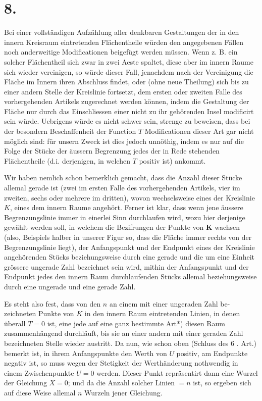 \documentclass[twoside,12pt, showframe]{memoir}
\begin{document}
\section*{8.}
Bei einer vollständigen Aufzählung aller denkbaren Gestaltungen der in den innern Kreisraum eintretenden Flächentheile würden den angegebenen Fällen noch anderweitige Modificationen beigefügt werden müssen. Wenn z. B. ein solcher Flächentheil sich zwar in zwei Aeste spaltet, diese aber im innern Raume sich wieder vereinigen, so würde dieser Fall, jenachdem nach der Vereinigung die Fläche im Innern ihren Abschluss findet, oder (ohne neue Theilung) sich bis zu einer andern Stelle der Kreislinie fortsetzt, dem ersten oder zweiten Falle des vorhergehenden Artikels zugerechnet werden können, indem die Gestaltung der Fläche nur durch das Einschliessen einer nicht zu ihr gehörenden Insel modificirt sein würde. Uebrigens würde es nicht schwer sein, strenge zu beweisen, dass bei der besondern Beschaffenheit der Function \(T\) Modificationen dieser Art gar nicht möglich sind: für unsern Zweck ist dies jedoch unnöthig, indem es nur auf die Folge der Stücke der äussern Begrenzung jedes der in Rede stehenden Flächentheile (d.i. derjenigen, in welchen \(T\) positiv ist) ankommt.

Wir haben nemlich schon bemerklich gemacht, dass die Anzahl dieser Stücke allemal gerade ist (zwei im ersten Falle des vorhergehenden Artikels, vier im zweiten, sechs oder mehrere im dritten), wovon wechselsweise eines der Kreislinie \(K\), eines dem innern Raume angehört. Ferner ist klar, dass wenn jene äussere Begrenzungslinie immer in einerlei Sinn durchlaufen wird, wozu hier derjenige gewählt werden soll, in welchem die Bezifrungen der Punkte von \(\boldsymbol{K}\) wachsen (also, Beispiels halber in unserer Figur so, dass die Fläche immer rechts von der Begrenzungslinie liegt), der Anfangspunkt und der Endpunkt eines der Kreislinie angehörenden Stücks beziehungsweise durch eine gerade und die um eine Einheit grössere ungerade Zahl bezeichnet sein wird, mithin der Anfangspunkt und der Endpunkt jedes den innern Raum durchlaufenden Stücks allemal beziehungsweise durch eine ungerade und eine gerade Zahl.

Es steht also fest, dass von den \(n\) an einem mit einer ungeraden Zahl be-
zeichneten Punkte von \(K\) in den innern Raum eintretenden Linien, in denen überall \(T=0\) ist, eine jede auf eine ganz bestimmte Art*) diesen Raum zusammenhängend durchläuft, bis sie an einer andern mit einer geraden Zahl bezeichneten Stelle wieder austritt. Da nun, wie schon oben (Schluss des 6 . Art.) bemerkt ist, in ihrem Anfangspunkte den Werth von \(U\) positiv, am Endpunkte negativ ist, so muss wegen der Stetigkeit der Werthänderung nothwendig in einem Zwischenpunkte \(U=0\) werden. Dieser Punkt repräsentirt dann eine Wurzel der Gleichung \(X=0\); und da die Anzahl solcher Linien \(=n\) ist, so ergeben sich auf diese Weise allemal \(n\) Wurzeln jener Gleichung.
\end{document}
